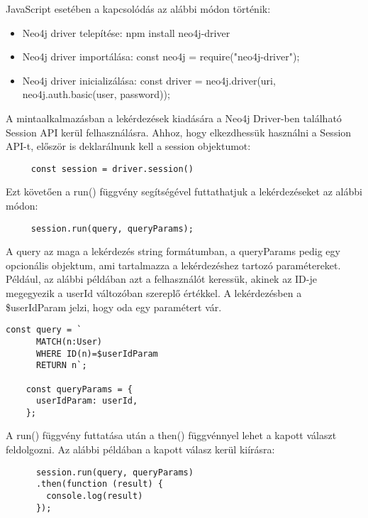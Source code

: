 \noindent JavaScript esetében a kapcsolódás az alábbi módon történik:
\begin{itemize}
    \item Neo4j driver telepítése: npm install neo4j-driver
    \item Neo4j driver importálása: const neo4j = require("neo4j-driver");
    \item Neo4j driver inicializálása: const driver = neo4j.driver(uri, neo4j.auth.basic(user, password));
\end{itemize}

A mintaalkalmazásban a lekérdezések kiadására a Neo4j Driver-ben található Session API kerül felhasználásra. \cite{neo4j-session-api} Ahhoz, hogy elkezdhessük használni a Session API-t, először is deklarálnunk kell a session objektumot:
\begin{lstlisting}
     const session = driver.session()
\end{lstlisting}

Ezt követően a run() függvény segítségével futtathatjuk a lekérdezéseket az alábbi módon:

\begin{lstlisting}
     session.run(query, queryParams);
\end{lstlisting}
 
A query az maga a lekérdezés string formátumban, a queryParams pedig egy opcionális objektum, ami tartalmazza a lekérdezéshez tartozó paramétereket. Például, az alábbi példában azt a felhasználót keressük, akinek az ID-je megegyezik a userId változóban szereplő értékkel. A lekérdezésben a \$userIdParam jelzi, hogy oda egy paramétert vár.

\begin{lstlisting}[columns=fullflexible]
     const query = `
      MATCH(n:User) 
      WHERE ID(n)=$userIdParam 
      RETURN n`;
      
    const queryParams = {
      userIdParam: userId,
    };
\end{lstlisting}

A run() függvény futtatása után a then() függvénnyel lehet a kapott választ feldolgozni. Az alábbi példában a kapott válasz kerül kiírásra:
\begin{lstlisting}
      session.run(query, queryParams)
      .then(function (result) {
        console.log(result)
      });
\end{lstlisting}

